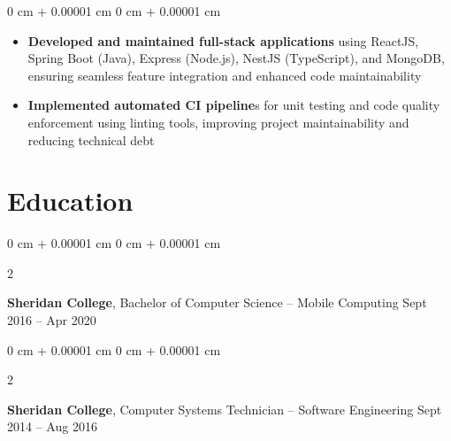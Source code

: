 \documentclass[11pt, letterpaper]{article}
\newenvironment{highlights}{
\begin{itemize}[
topsep=0.10 cm,
parsep=0.10 cm,
partopsep=0pt,
itemsep=0pt,
leftmargin=0 cm + 10pt
]
}{
\end{itemize}
} %
\newenvironment{onecolentry}{
\begin{adjustwidth}{
0 cm + 0.00001 cm
}{
0 cm + 0.00001 cm
}
}{
\end{adjustwidth}
} %
\newenvironment{twocolentry}[2][]{
\onecolentry
\def\secondColumn{#2}
\setcolumnwidth{\fill, 4.5 cm}
\begin{paracol}{2}
}{
\switchcolumn \raggedleft \secondColumn
\end{paracol}
\endonecolentry
} %
\begin{document}
\vspace{0.10 cm}
\begin{onecolentry}
\begin{highlights}
\item \textbf{Developed and maintained full-stack applications} using ReactJS, Spring Boot (Java), Express (Node.js), NestJS (TypeScript), and MongoDB, ensuring seamless feature integration and enhanced code maintainability
\item \textbf{Implemented automated CI pipeline}s for unit testing and code quality enforcement using linting tools, improving project maintainability and reducing technical debt
\end{highlights}



\end{onecolentry}


\section{Education}




\begin{twocolentry}{
Sept 2016 – Apr 2020

}
\textbf{Sheridan College}, Bachelor of Computer Science – Mobile Computing\end{twocolentry}

\vspace{0.10 cm}

\begin{twocolentry}{
Sept 2014 – Aug 2016
}
\textbf{Sheridan College}, Computer Systems Technician – Software Engineering\end{twocolentry}

\vspace{0.10 cm}
\end{document}
